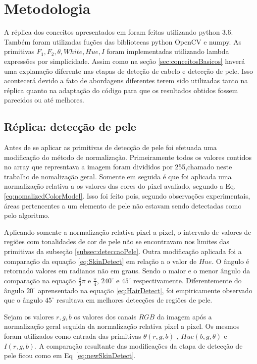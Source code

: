 \documentclass[journal,onecolumn]{IEEEtran}
\begin{document}
	\section{Metodologia}
	\label{sec:metodologia}
	
	A réplica dos conceitos apresentados em \cite{chen2007simple} foram feitas utilizando python 3.6.
	Também foram utilizadas fuções das bibliotecas python OpenCV e numpy.
	As primitivas $F_1,F_2,\theta,White,Hue,I$  foram implementadas utilizando lambda expressões por simplicidade.
	Assim como na seção \ref{sec:conceitosBasicos} haverá uma explanação diferente nas etapas de deteção de cabelo e detecção de pele. 
	Isso acontecerá devido a fato de abordagens diferentes terem sido utilizadas tanto na réplica quanto na adaptação do código para que os resultados obtidos fossem parecidos ou até melhores.
	
	\subsection{Réplica: detecção de pele}
	
	Antes de se aplicar as primitivas de detecção de pele foi efetuada uma modificação do método de normalização.
	Primeiramente todos os valores contidos no array que represntava a imagem foram divididos por 255,chamado neste trabalho de nomalização geral.
	Somente em seguida é que foi aplicada uma normalização relativa a os valores das cores do pixel avaliado, segundo a Eq. \eqref{eq:nomalizedColorModel}.
	Isso foi feito pois, segundo observações experimentais, áreas pertencentes a um elemento de pele não estavam sendo detectadas como pelo algoritmo.
	
	Aplicando somente a normalização relativa pixel a pixel, o intervalo de valores de regiões com tonalidades de cor de pele não se encontravam nos limites das primitivas da subseção \ref{subsec:deteccaoPele}.
	Outra modificação aplicada foi a comparação da equação \eqref{eq:SkinDetect} em relação a o valor de $Hue$.
	O ângulo é retornado valores em radianos não em graus.
	Sendo o maior e o menor ângulo da comparação na equação $\frac{4}{3}\pi$ e $\frac{\pi}{4}$,  $240^\circ$ e $45^\circ$ respectivamente.
	Diferentemente do ângulo $20^\circ$ aprensentado na equação \eqref{eq:HairDetect}, foi empiricamente observado que o ângulo $45^\circ$ resultava em melhores detecções de regiões de pele.
	
	Sejam os valores $r,g,b$ os valores dos canais $RGB$ da imagem após a normalização geral seguida da normalização relativa pixel a pixel. 
	Os mesmos foram utilizados como entrada das primitivas $\theta (r,g,b)$ , $Hue(b,g,\theta)$ e $I(r,g,b)$.
	A comparação resultante das modificações da etapa de detecção de pele ficou como em Eq~\eqref{eq:newSkinDetect}.
\end{document}
